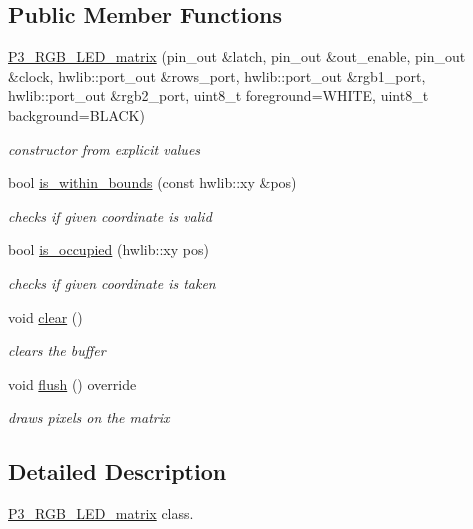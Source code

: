 \subsection*{Public Member Functions}
\begin{DoxyCompactItemize}
\item 
\hyperlink{classmatrix_1_1P3__RGB__LED__matrix_aadf4b19a9e7a0abc01387b87e92f6c7d}{P3\+\_\+\+R\+G\+B\+\_\+\+L\+E\+D\+\_\+matrix} (pin\+\_\+out \&latch, pin\+\_\+out \&out\+\_\+enable, pin\+\_\+out \&clock, hwlib\+::port\+\_\+out \&rows\+\_\+port, hwlib\+::port\+\_\+out \&rgb1\+\_\+port, hwlib\+::port\+\_\+out \&rgb2\+\_\+port, uint8\+\_\+t foreground=W\+H\+I\+TE, uint8\+\_\+t background=B\+L\+A\+CK)
\begin{DoxyCompactList}\small\item\em constructor from explicit values \end{DoxyCompactList}\item 
bool \hyperlink{classmatrix_1_1P3__RGB__LED__matrix_a217534f5145dad527103fa2c17484b6a}{is\+\_\+within\+\_\+bounds} (const hwlib\+::xy \&pos)
\begin{DoxyCompactList}\small\item\em checks if given coordinate is valid \end{DoxyCompactList}\item 
bool \hyperlink{classmatrix_1_1P3__RGB__LED__matrix_a6a402271f9f13d646be69fe39e5b08b6}{is\+\_\+occupied} (hwlib\+::xy pos)
\begin{DoxyCompactList}\small\item\em checks if given coordinate is taken \end{DoxyCompactList}\item 
void \hyperlink{classmatrix_1_1P3__RGB__LED__matrix_ad620281eed116f01cab6cadd01156b12}{clear} ()
\begin{DoxyCompactList}\small\item\em clears the buffer \end{DoxyCompactList}\item 
void \hyperlink{classmatrix_1_1P3__RGB__LED__matrix_a50d11c7dfc0ba8d528c59be288377b8a}{flush} () override
\begin{DoxyCompactList}\small\item\em draws pixels on the matrix \end{DoxyCompactList}\end{DoxyCompactItemize}


\subsection{Detailed Description}
\hyperlink{classmatrix_1_1P3__RGB__LED__matrix}{P3\+\_\+\+R\+G\+B\+\_\+\+L\+E\+D\+\_\+matrix} class. 


